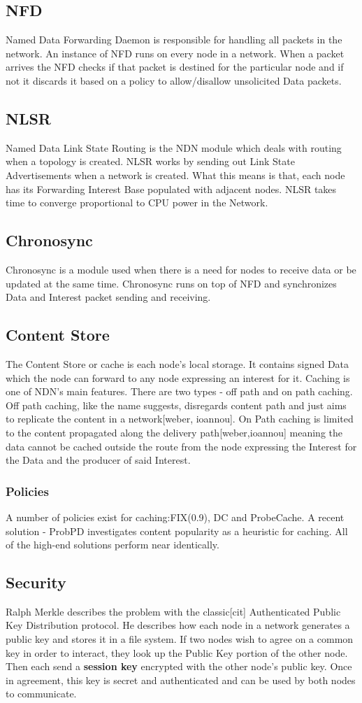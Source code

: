 \subsection{NFD}
Named Data Forwarding Daemon is responsible for handling all packets in the network. An instance of NFD runs on every node in a network. When a packet arrives the NFD checks if that packet is destined for the particular node and if not it discards it based on a policy to allow/disallow unsolicited Data packets.
\subsection{NLSR}
Named Data Link State Routing is the NDN module which deals with routing when a topology is created. NLSR works by sending out Link State Advertisements when a network is created. What this means is that, each node has its Forwarding Interest Base populated with adjacent nodes. NLSR takes time to converge proportional to CPU power in the Network. 
\subsection{Chronosync}
Chronosync is a module used when there is a need for nodes to receive data or be updated at the same time. Chronosync runs on top of NFD and synchronizes Data and Interest packet sending and receiving.
\subsection{Content Store}
The Content Store or cache is each node's local storage. It contains signed Data which the node can forward to any node expressing an interest for it. Caching is one of NDN's main features. There are two types - off path and on path caching. Off path caching, like the name suggests, disregards content path and just aims to replicate the content in a network[weber, ioannou]. On Path caching is limited to the content propagated along the delivery path[weber,ioannou] meaning the data cannot be cached outside the route from the node expressing the Interest for the Data and the producer of said Interest.
\subsubsection{Policies}
A number of policies exist for caching:FIX(0.9), DC and ProbeCache. A recent solution - ProbPD investigates content popularity as a heuristic for caching. All of the high-end solutions perform near identically.
\subsection{Security}
Ralph Merkle describes the problem with the classic[cit] Authenticated Public Key Distribution protocol. He describes how each node in a network generates a public key and stores it in a file system. If two nodes wish to agree on a common key in order to interact, they look up the Public Key portion of the other node. Then each send a \textbf{session key} encrypted with the other node's public key. Once in agreement, this key is secret and authenticated and can be used by both nodes to communicate. 

